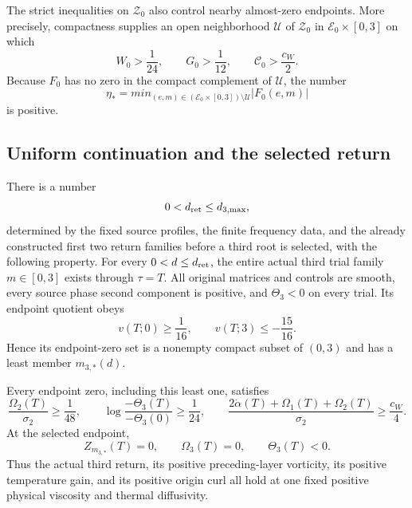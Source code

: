 The strict inequalities on $\mathcal Z_0$ also control nearby almost-zero
endpoints.  More precisely, compactness supplies an open neighborhood
$\mathcal U$ of $\mathcal Z_0$ in
$\mathcal E_0\times[0,3]$ on which
\begin{equation}\label{cvlane:trc:near-root-margins}
 W_0>\frac1{24},\qquad G_0>\frac1{12},
 \qquad \mathcal C_0>\frac{c_W}{2}.
\end{equation}
Because $F_0$ has no zero in the compact complement of $\mathcal U$, the
number
\begin{equation}\label{cvlane:trc:eta}
 \eta_*=min_{(e,m)\in
  (\mathcal E_0\times[0,3])\setminus\mathcal U}|F_0(e,m)|
\end{equation}
is positive.

\subsection{Uniform continuation and the selected return}

\begin{cvlanetheorem}\label{cvlane:trc:third-return}
There is a number
\[
 0<d_{\rm ret}\leq d_{3,\max},
\]
determined by the fixed source profiles, the finite frequency data, and
the already constructed first two return families before a third root is
selected, with the following property.  For every
$0<d\leq d_{\rm ret}$, the entire actual third trial family
$m\in[0,3]$ exists through $\tau=T$.  All original matrices and controls
are smooth, every source phase second component is positive, and
$\Theta_3<0$ on every trial.  Its endpoint quotient obeys
\begin{equation}\label{cvlane:trc:diffusive-signs}
 v(T;0)\geq\frac1{16},\qquad
 v(T;3)\leq-\frac{15}{16}.
\end{equation}
Hence its endpoint-zero set is a nonempty compact subset of $(0,3)$ and
has a least member $m_{3,*}(d)$.

Every endpoint zero, including this least one, satisfies
\begin{equation}\label{cvlane:trc:diffusive-root-bounds}
 \frac{\Omega_2(T)}{\sigma_2}\geq\frac1{48},\qquad
 \log\frac{-\Theta_3(T)}{-\Theta_3(0)}\geq\frac1{24},
 \qquad
 \frac{2\dot\alpha(T)+\Omega_1(T)+\Omega_2(T)}{\sigma_2}
       \geq\frac{c_W}{4}.
\end{equation}
At the selected endpoint,
\begin{equation}\label{cvlane:trc:return-state}
 Z_{m_{3,*}}(T)=0,\qquad \Omega_3(T)=0,
 \qquad \Theta_3(T)<0.
\end{equation}
Thus the actual third return, its positive preceding-layer vorticity, its
positive temperature gain, and its positive origin curl all hold at one
fixed positive physical viscosity and thermal diffusivity.
\end{cvlanetheorem}

